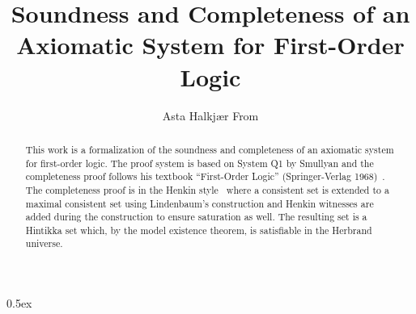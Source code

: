 \documentclass[11pt,a4paper]{article}
\begin{document}
\title{Soundness and Completeness of an Axiomatic System for First-Order Logic}
\author{Asta Halkjær From}
\maketitle

\begin{abstract}
  This work is a formalization of the soundness and completeness of an axiomatic system
  for first-order logic. The proof system is based on System Q1 by Smullyan
  and the completeness proof follows his textbook ``First-Order Logic'' (Springer-Verlag 1968)~\cite{Smullyan1968}.
  The completeness proof is in the Henkin style~\cite{Henkin96} where a consistent set
  is extended to a maximal consistent set using Lindenbaum's construction
  and Henkin witnesses are added during the construction to ensure saturation as well.
  The resulting set is a Hintikka set which, by the model existence theorem, is satisfiable
  in the Herbrand universe.
\end{abstract}

\tableofcontents

\newpage

\parindent 0pt\parskip 0.5ex





\end{document}
